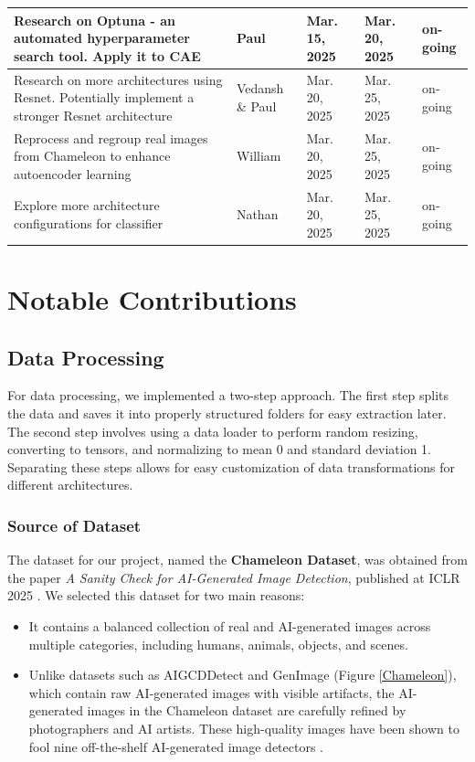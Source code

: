 \documentclass{article} %
\begin{document}
\begin{table}[t]
\begin{center}
\begin{tabular}{|>{\raggedright\arraybackslash}p{4cm}|>{\raggedright\arraybackslash}p{2.5cm}|>{\raggedright\arraybackslash}p{2cm}|>{\raggedright\arraybackslash}p{2cm}|>{\raggedright\arraybackslash}p{1.5cm}|}
    \hline
    Research on Optuna - an automated hyperparameter search tool. Apply it to CAE & Paul & Mar. 15, 2025 & Mar. 20, 2025 & on-going \\
    \hline
    Research on more architectures using Resnet. Potentially implement a stronger Resnet architecture & Vedansh \& Paul & Mar. 20, 2025 & Mar. 25, 2025 & on-going \\
    \hline
    Reprocess and regroup real images from Chameleon to enhance autoencoder learning & William & Mar. 20, 2025 & Mar. 25, 2025 & on-going \\
    \hline
    Explore more architecture configurations for classifier & Nathan & Mar. 20, 2025 & Mar. 25, 2025 & on-going \\
    \hline
    \end{tabular}
    \end{center}
    \end{table}
    

    
\section{Notable Contributions}
\subsection{Data Processing}

For data processing, we implemented a two-step approach. The first step splits the data and saves it into properly structured folders for easy extraction later. The second step involves using a data loader to perform random resizing, converting to tensors, and normalizing to mean 0 and standard deviation 1. Separating these steps allows for easy customization of data transformations for different architectures.

\subsubsection{Source of Dataset}
The dataset for our project, named the \textbf{Chameleon Dataset}, was obtained from the paper \emph{A Sanity Check for AI-Generated Image Detection}, published at ICLR 2025 \citep{yan2024sanity}. We selected this dataset for two main reasons:

\begin{itemize}
    \item It contains a balanced collection of real and AI-generated images across multiple categories, including humans, animals, objects, and scenes.
    \item Unlike datasets such as AIGCDDetect and GenImage (Figure \ref{Chameleon}), which contain raw AI-generated images with visible artifacts, the AI-generated images in the Chameleon dataset are carefully refined by photographers and AI artists. These high-quality images have been shown to fool nine off-the-shelf AI-generated image detectors \citep{yan2024sanity}.
\end{itemize}
\end{document}
